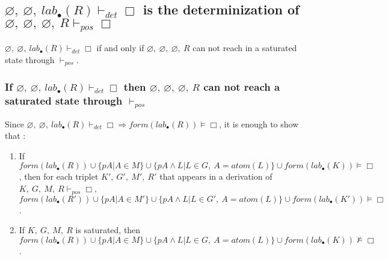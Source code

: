 \documentclass[a4paper,10pt]{report}
\newcommand{\atom}{\mathit{atom}}
\newcommand{\pos}{\vdash_\mathit{pos}}
\newcommand{\dett}{\vdash_\mathit{det}}
\newcommand{\F}{\mathit{form}}
\newcommand{\T}{\mathit{lab}}
\begin{document}
\subsection{$\varnothing,\ \varnothing,\ \T_\bullet(R)\dett\Box$ is the determinization of
$\varnothing,\ \varnothing,\ \varnothing,\ R\pos\Box$}
$\varnothing,\ \varnothing,\ \T_\bullet(R)\dett\Box$ if and only if
$\varnothing,\ \varnothing,\ \varnothing,\ R$ can not reach in a saturated state through $\pos$.

\subsubsection*{If $\varnothing,\ \varnothing,\ \T_\bullet(R)\dett\Box$ then
$\varnothing,\ \varnothing,\ \varnothing,\ R$ can not reach a saturated state through $\pos$}

Since $\varnothing,\ \varnothing,\ \T_\bullet(R)\dett\Box \Rightarrow\F(\T_\bullet(R))\vDash\Box$,
it is enough to show that :
\begin{enumerate}
 \item If $\F(\T_\bullet(R))\cup\{pA|A\in M\}\cup\{pA\wedge L|L\in G,\ A=\atom(L)\}
\cup\F(\T_\bullet(K))\vDash\Box$,
then for each triplet $K',\ G',\ M',\ R'$ that appears in a derivation of $K,\ G,\ M,\ R\pos\Box$,
$\F(\T_\bullet(R'))\cup\{pA|A\in M'\}\cup\{pA\wedge L|L\in G',\ A=\atom(L)\}
\cup\F(\T_\bullet(K'))\vDash\Box$.
 \item If $K,\ G,\ M,\ R$ is saturated, then
$\F(\T_\bullet(R))\cup\{pA|A\in M\}\cup\{pA\wedge L|L\in G,\ A=\atom(L)\}\cup
\F(\T_\bullet(K))\nvDash\Box$.
\end{enumerate}
\end{document}
